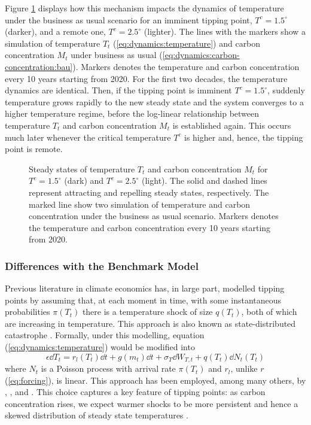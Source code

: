 \documentclass[../../main.tex]{subfiles}
\begin{document}
Figure \ref{fig:nullclines} displays how this mechanism impacts the dynamics of temperature under the business as usual scenario for an imminent tipping point, $T^c = 1.5^\circ$ (darker), and a remote one, $T^c = 2.5^\circ$ (lighter). The lines with the markers show a simulation of temperature $T_t$ (\ref{eq:dynamics:temperature}) and carbon concentration $M_t$ under business as usual (\ref{eq:dynamics:carbon-concentration:bau}). Markers denotes the temperature and carbon concentration every 10 years starting from 2020. For the first two decades, the temperature dynamics are identical. Then, if the tipping point is imminent $T^c = 1.5^\circ$, suddenly temperature grows rapidly to the new steady state and the system converges to a higher temperature regime, before the log-linear relationship between temperature $T_t$ and carbon concentration $M_t$ is established again. This occurs much later whenever the critical temperature $T^c$ is higher and, hence, the tipping point is remote. \begin{figure}[htbp]
    \centering
    
    \caption{Steady states of temperature $T_t$ and carbon concentration $M_t$ for $T^c = 1.5^\circ$ (dark) and $T^c = 2.5^\circ$ (light). The solid and dashed lines represent attracting and repelling steady states, respectively. The marked line show two simulation of temperature and carbon concentration under the business as usual scenario. Markers denotes the temperature and carbon concentration every 10 years starting from 2020.}
    \label{fig:nullclines}
\end{figure}

\subsubsection{Differences with the Benchmark Model}


Previous literature in climate economics has, in large part, modelled tipping points by assuming that, at each moment in time, with some instantaneous probabilities $\pi(T_t)$ there is a temperature shock of size $q(T_t)$, both of which are increasing in temperature. This approach is also known as state-distributed catastrophe \citep{li_economics_2024}. Formally, under this modelling, equation (\ref{eq:dynamics:temperature}) would be modified into \begin{equation}
    \epsilon \dd{T}_t = r_l(T_t) \dd{t} + g(m_t) \dd{t} + \sigma_T \dd{W}_{T, t} + q(T_t) \dd{N}_{t}(T_t)
\end{equation} where $N_t$ is a Poisson process with arrival rate $\pi(T_t)$ and $r_l$, unlike $r$ (\ref{eq:forcing}), is linear. This approach has been employed, among many others, by \cite{hambel_optimal_2021}, \cite{van_der_ploeg_climate_2018}, and \cite{lemoine_ambiguous_2016}. This choice captures a key feature of tipping points: as carbon concentration rises, we expect warmer shocks to be more persistent and hence a skewed distribution of steady state temperatures \citep{intergovernmental_panel_on_climate_change_climate_2023}.
\end{document}
